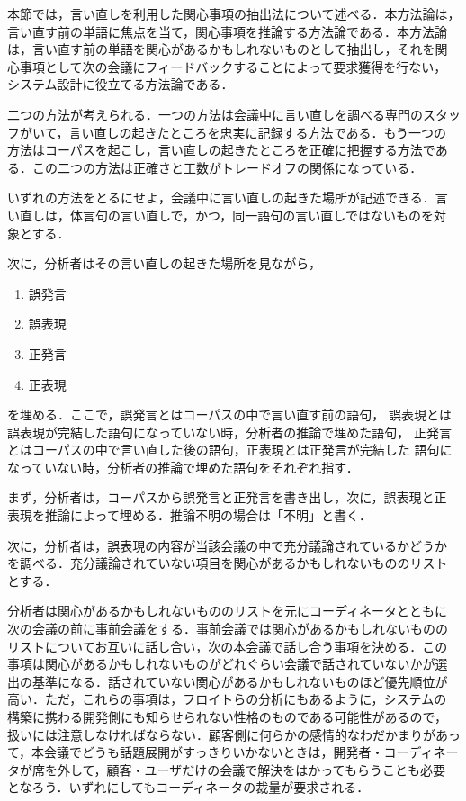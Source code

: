 本節では，言い直しを利用した関心事項の抽出法について述べる．本方法論は，
言い直す前の単語に焦点を当て，関心事項を推論する方法論である．本方法論
は，言い直す前の単語を関心があるかもしれないものとして抽出し，それを関
心事項として次の会議にフィードバックすることによって要求獲得を行ない，
システム設計に役立てる方法論である．

二つの方法が考えられる．一つの方法は会議中に言い直しを調べる専門のスタッ
フがいて，言い直しの起きたところを忠実に記録する方法である．もう一つの
方法はコーパスを起こし，言い直しの起きたところを正確に把握する方法であ
る．この二つの方法は正確さと工数がトレードオフの関係になっている．

いずれの方法をとるにせよ，会議中に言い直しの起きた場所が記述できる．言
い直しは，体言句の言い直しで，かつ，同一語句の言い直しではないものを対
象とする．

次に，分析者はその言い直しの起きた場所を見ながら，

\begin{enumerate}
\item 誤発言
\item 誤表現
\item 正発言
\item 正表現
\end{enumerate}

\noindent を埋める．ここで，誤発言とはコーパスの中で言い直す前の語句，
誤表現とは誤表現が完結した語句になっていない時，分析者の推論で埋めた語句，
正発言とはコーパスの中で言い直した後の語句，正表現とは正発言が完結した
語句になっていない時，分析者の推論で埋めた語句をそれぞれ指す．

まず，分析者は，コーパスから誤発言と正発言を書き出し，次に，誤表現と正
表現を推論によって埋める．推論不明の場合は「不明」と書く．

次に，分析者は，誤表現の内容が当該会議の中で充分議論されているかどうか
を調べる．充分議論されていない項目を関心があるかもしれないもののリスト
とする．

分析者は関心があるかもしれないもののリストを元にコーディネータとともに
次の会議の前に事前会議をする．事前会議では関心があるかもしれないものの
リストについてお互いに話し合い，次の本会議で話し合う事項を決める．この
事項は関心があるかもしれないものがどれぐらい会議で話されていないかが選
出の基準になる．話されていない関心があるかもしれないものほど優先順位が
高い．ただ，これらの事項は，フロイトらの分析にもあるように，システムの
構築に携わる開発側にも知らせられない性格のものである可能性があるので，
扱いには注意しなければならない．顧客側に何らかの感情的なわだかまりがあっ
て，本会議でどうも話題展開がすっきりいかないときは，開発者・コーディネー
タが席を外して，顧客・ユーザだけの会議で解決をはかってもらうことも必要
となろう．いずれにしてもコーディネータの裁量が要求される．

